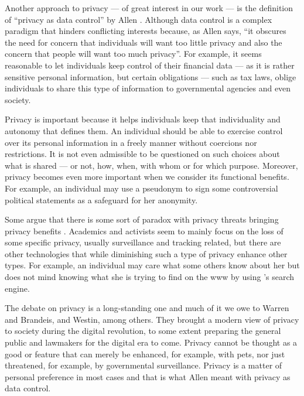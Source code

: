 Another approach to privacy --- of great interest in our work --- is the definition 
of ``privacy as data control'' by Allen \cite{Allen99}. Although data control is 
a complex paradigm that hinders conflicting interests because, as Allen says, ``it 
obscures the need for concern that individuals will want too little privacy and 
also the concern that people will want too much privacy''. For example, it seems 
reasonable to let individuals keep control of their financial data --- as it is 
rather sensitive personal information, but certain obligations --- such as tax laws, 
oblige individuals to share this type of information to governmental agencies and 
even society.

Privacy is important because it helps individuals keep that individuality and autonomy 
that defines them. An individual should be able to exercise control over its personal 
information in a freely manner without coercions nor restrictions. It is not even 
admissible to be questioned on such choices about what is shared --- or not, how, 
when, with whom or for which purpose. Moreover, privacy becomes even more important 
when we consider its functional benefits. For example, an individual may use a pseudonym 
to sign some controversial political statements as a safeguard for her anonymity.

Some argue that there is some sort of paradox with privacy threats bringing privacy 
benefits \cite{WittesL15}. Academics and activists seem to mainly focus on the loss 
of some specific privacy, usually surveillance and tracking related, but there are 
other technologies that while diminishing such a type of privacy enhance other types. 
For example, an individual may care what some others know about her but does not 
mind \Google knowing what she is trying to find on the \ac{www} by using \Google's 
search engine.

The debate on privacy is a long-standing one and much of it we owe to Warren and 
Brandeis, and Westin, among others. They brought a modern view of privacy to society 
during the digital revolution, to some extent preparing the general public and lawmakers 
for the digital era to come. Privacy cannot be thought as a good or feature that 
can merely be enhanced, for example, with \acp{pet}, nor just threatened, for example, 
by governmental surveillance. Privacy is a matter of personal preference in most 
cases and that is what Allen meant with privacy as data control.

